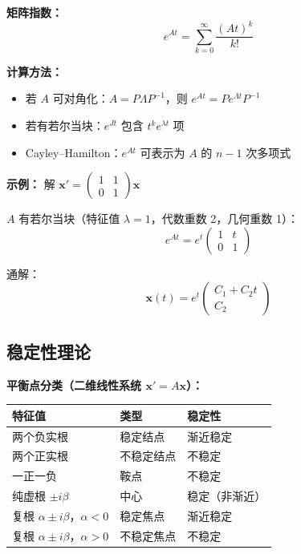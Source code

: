 \textbf{矩阵指数：}
\[
e^{At} = \sum_{k=0}^{\infty} \frac{(At)^k}{k!}
\]

\textbf{计算方法：}
\begin{itemize}
  \item 若 $A$ 可对角化：$A = P\Lambda P^{-1}$，则 $e^{At} = Pe^{\Lambda t}P^{-1}$
  \item 若有若尔当块：$e^{Jt}$ 包含 $t^k e^{\lambda t}$ 项
  \item Cayley--Hamilton：$e^{At}$ 可表示为 $A$ 的 $n-1$ 次多项式
\end{itemize}

\textbf{示例：} 解 $\mathbf{x}' = \begin{pmatrix} 1 & 1 \\ 0 & 1 \end{pmatrix}\mathbf{x}$

$A$ 有若尔当块（特征值 $\lambda = 1$，代数重数 2，几何重数 1）：
\[
e^{At} = e^t \begin{pmatrix} 1 & t \\ 0 & 1 \end{pmatrix}
\]

通解：
\[
\mathbf{x}(t) = e^t \begin{pmatrix} C_1 + C_2 t \\ C_2 \end{pmatrix}
\]

\subsection{稳定性理论}

\textbf{平衡点分类（二维线性系统 $\mathbf{x}' = A\mathbf{x}$）：}

\begin{center}
\begin{tabular}{p{3.5cm}p{3cm}p{3cm}}
\toprule
\textbf{特征值} & \textbf{类型} & \textbf{稳定性} \\
\midrule
两个负实根 & 稳定结点 & 渐近稳定 \\
两个正实根 & 不稳定结点 & 不稳定 \\
一正一负 & 鞍点 & 不稳定 \\
纯虚根 $\pm i\beta$ & 中心 & 稳定（非渐近） \\
复根 $\alpha \pm i\beta$，$\alpha < 0$ & 稳定焦点 & 渐近稳定 \\
复根 $\alpha \pm i\beta$，$\alpha > 0$ & 不稳定焦点 & 不稳定 \\
\bottomrule
\end{tabular}
\end{center}

